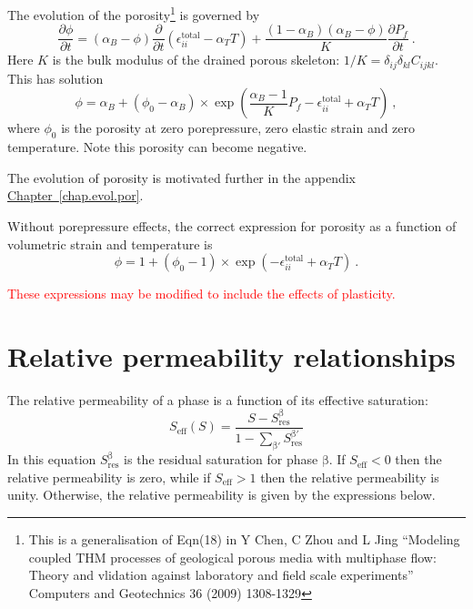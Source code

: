 \documentclass[12pt]{report}
\def\phase{\mathrm{\beta}}
\begin{document}
The evolution of the porosity\footnote{This is a generalisation of
  Eqn(18) in Y Chen, C Zhou and L Jing ``Modeling coupled THM
  processes of geological porous media with multiphase flow: Theory
  and vlidation against laboratory and field scale experiments''
  Computers and Geotechnics 36 (2009) 1308-1329} is governed by
\begin{equation}
\frac{\partial \phi}{\partial t} = (\alpha_{B} -
\phi)\frac{\partial}{\partial t}
\left(\epsilon^{\mathrm{total}}_{ii} - \alpha_{T} T\right) +
\frac{(1-\alpha_{B})(\alpha_{B}-\phi)}{K}\frac{\partial
  P_{f}}{\partial t} \ .
\label{eqn.phi.dog}
\end{equation}
Here $K$ is the bulk modulus of the drained porous skeleton: $1/K
= \delta_{ij}\delta_{kl}C_{ijkl}$.  This has solution
\begin{equation}
\phi = \alpha_{B} + (\phi_{0} - \alpha_{B})\times \exp \left( \frac{\alpha_{B}
  - 1}{K}P_{f} - \epsilon^{\mathrm{total}}_{ii} + \alpha_{T}T \right) \ ,
\label{poro.evolve.eqn}
\end{equation}
where $\phi_{0}$ is the porosity at zero porepressure, zero elastic
strain and zero temperature. Note this porosity can become negative.

The evolution of porosity is motivated further in the appendix
\hyperref[chap.evol.por]{Chapter~\ref*{chap.evol.por}}.

Without porepressure effects, the correct expression for porosity as a
function of volumetric strain and temperature is
\begin{equation}
\phi = 1 + (\phi_{0} - 1)\times \exp \left(- \epsilon^{\mathrm{total}}_{ii} + \alpha_{T}T \right) \ .
\end{equation}

\textcolor{red}{These expressions may be modified to include the
  effects of plasticity.}

\section{Relative permeability relationships}

The relative permeability of a phase is a function of its effective
saturation:
\begin{equation}
S_{\mathrm{eff}}(S) = \frac{S - S_{\mathrm{res}}^{\phase}}{1 -
  \sum_{\phase'}S_{\mathrm{res}}^{\phase'}}
\end{equation}
In this equation $S_{\mathrm{res}}^{\phase}$ is the residual
saturation for phase $\phase$.  If $S_{\mathrm{eff}} < 0$ then the
relative permeability is zero, while if $S_{\mathrm{eff}}>1$ then the
relative permeability is unity.  Otherwise, the relative permeability
is given by the expressions below.
\end{document}
